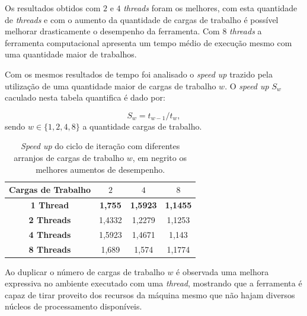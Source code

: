 Os resultados obtidos com $2$ e $4$ \textit{threads} foram os melhores, com esta quantidade de \textit{threads} e com o aumento da quantidade de cargas de trabalho é possível melhorar drasticamente o desempenho da ferramenta. Com $8$ \textit{threads} a ferramenta computacional apresenta um tempo médio de execução mesmo com uma quantidade maior de trabalhos.

Com os mesmos resultados de tempo foi analisado o \textit{speed up} trazido pela utilização de uma quantidade maior de cargas de trabalho $w$. O \textit{speed up} $S_w$ caculado nesta tabela quantifica é dado por:

\begin{equation}
	S_w = t_{w-1}/t_{w},
	\label{eq:speedup2}
\end{equation}
sendo $w \in \{1,2,4,8\}$ a quantidade cargas de trabalho.

\begin{table}[!htbp]
\caption{\textit{Speed up} do ciclo de iteração com diferentes arranjos de cargas de trabalho $w$, em negrito os melhores aumentos de desempenho.}
\centering{}
\begin{tabular}{c|c|c|c}
	\toprule 
	\textbf{Cargas de Trabalho} & $2$ & $4$  & $8$\\ 
	\midrule 
	\textbf{1 Thread} & \textbf{1,755} &	\textbf{1,5923} &	\textbf{1,1455} \\ 
	\midrule 
	\textbf{2 Threads} & 1,4332 &	1,2279 & 1,1253\\ 
	\midrule 
	\textbf{4 Threads} & 1,5923 &	1,4671 &	1,143\\ 
	\midrule 
	\textbf{8 Threads} & 1,689 &	1,574 & 1,1774	\\ 
	\bottomrule 
\end{tabular} 
\label{tab1:speedup2}
\end{table}

Ao duplicar o número de cargas de trabalho $w$ é observada uma melhora expressiva no ambiente executado com uma \textit{thread}, mostrando que a ferramenta é capaz de tirar proveito dos recursos da máquina mesmo que não hajam diversos núcleos de processamento disponíveis.
